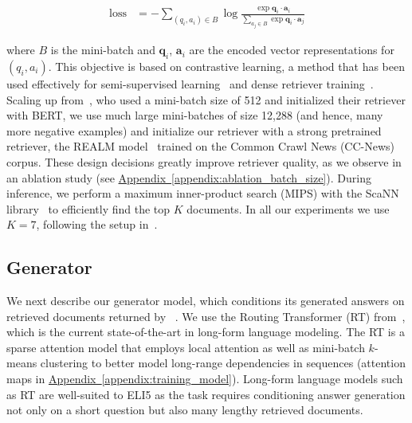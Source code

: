 \documentclass[11pt]{article}
\newcommand{\namedref}[2]{\hyperref[#2]{#1~\ref*{#2}}}
\newcommand{\appendixref}[1]{\namedref{Appendix}{#1}}
\newcommand{\retriever}[1]{\textsc{c-REALM}}
\begin{document}
\begin{align*}
    \text{loss} &= - \sum_{(q_i, a_i) \in B} \log \frac{\exp \mathbf{q}_i \cdot \mathbf{a}_i}{\sum_{a_j \in B} \exp \mathbf{q}_i \cdot \mathbf{a}_j}
\end{align*}

where $B$ is the mini-batch and $\mathbf{q}_i$, $\mathbf{a}_i$ are the encoded vector representations for $(q_i, a_i)$. This objective is based on contrastive learning, a method that has been used effectively for semi-supervised learning~\citep{chen2020simple} and dense retriever training~\citep{karpukhin2020dense}. Scaling up from~\citet{jernite2020}, who used a mini-batch size of 512 and initialized their retriever with BERT, we use much large mini-batches of size 12,288 (and hence, many more negative examples) and initialize our retriever with a strong pretrained retriever, the REALM model~\citep{guu2020realm} trained on the Common Crawl News (CC-News) corpus. These design decisions greatly improve retriever quality, as we observe in an ablation study (see \appendixref{appendix:ablation_batch_size}). During inference, we perform a maximum inner-product search (MIPS) with the ScaNN library~\citep{avq_2020} to efficiently find the top $K$ documents. In all our experiments we use $K=7$, following the setup in~\citet{guu2020realm}.

\subsection{Generator}

We next describe our generator model, which conditions its generated answers on retrieved documents returned by \retriever~. We use the Routing Transformer (RT) from~\citet{roy2020efficient}, which is the current
state-of-the-art in long-form language modeling. The RT is a sparse attention model that employs 
local attention as well as mini-batch $k$-means clustering to better model long-range 
dependencies in sequences (attention maps in \appendixref{appendix:training_model}). Long-form language models such as RT are well-suited to ELI5 as the task requires conditioning answer generation not only on a short question but also many lengthy retrieved documents. 
\end{document}
